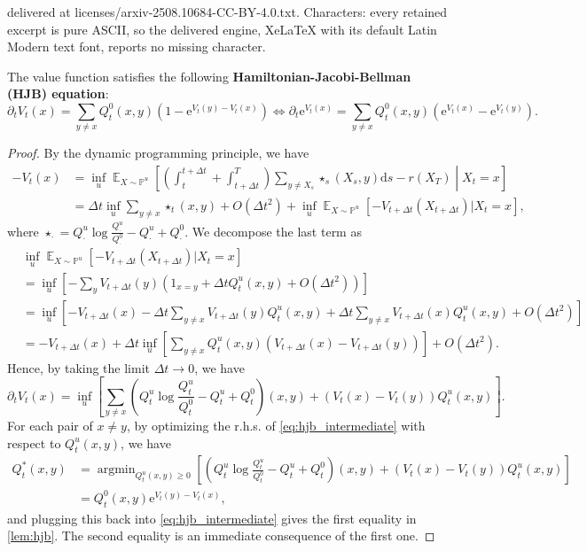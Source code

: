 \documentclass[10pt,a4paper]{amsart}
\newcommand{\E}{\operatorname{\mathbb{E}}}
\newcommand{\argmin}{\mathop\mathrm{argmin}}
\newcommand{\e}{\mathrm{e}}
\newcommand{\ro}[1]{\left(#1\right)} %
\newcommand{\sq}[1]{\left[#1\right]} %
\renewcommand{\P}{\mathbb{P}}
\renewcommand{\d}{\mathrm{d}}
\begin{document}
delivered at licenses/arxiv-2508.10684-CC-BY-4.0.txt. Characters: every retained excerpt is pure ASCII, so the delivered engine, XeLaTeX with its default Latin Modern text font, reports no missing character.
\begin{lemma}
    The value function satisfies the following \textbf{Hamiltonian-Jacobi-Bellman (HJB) equation}:
    \begin{equation}
        \partial_tV_t(x)=\sum_{y\ne x}Q^0_t(x,y)(1-\e^{V_t(y)-V_t(x)})\iff\partial_t\e^{V_t(x)}=\sum_{y\ne x}Q^0_t(x,y)(\e^{V_t(x)}-\e^{V_t(y)}).
        \label{eq:hjb}
    \end{equation}
    \label{lem:hjb}
\end{lemma}

\begin{proof}
By the dynamic programming principle, we have
\begin{align*}
    -V_t(x)&=\inf_u\E_{X\sim\P^u}\sq{\ro{\int_t^{t+\Delta t}+\int_{t+\Delta t}^T}\sum_{y\ne X_s}\star_s(X_s,y)\d s-r(X_T)\middle|X_t=x}\\
    &=\Delta t\inf_u\sum_{y\ne x}\star_t(x,y)+O(\Delta t^2)+\inf_u\E_{X\sim\P^u}[-V_{t+\Delta t}(X_{t+\Delta t})|X_t=x],
\end{align*}
where $\star_\cdot=Q^u_\cdot\log\frac{Q^u_\cdot}{Q^0_\cdot}-Q^u_\cdot+Q^0_\cdot$. We decompose the last term as
\begin{align*}
    &\inf_u\E_{X\sim\P^u}[-V_{t+\Delta t}(X_{t+\Delta t})|X_t=x]\\
    &=\inf_u\sq{-\sum_yV_{t+\Delta t}(y)\ro{1_{x=y}+\Delta tQ^u_t(x,y)+O(\Delta t^2)}}\\
    &=\inf_u\sq{-V_{t+\Delta t}(x)-\Delta t\sum_{y\ne x}V_{t+\Delta t}(y)Q^u_t(x,y)+\Delta t\sum_{y\ne x}V_{t+\Delta t}(x)Q^u_t(x,y)+O(\Delta t^2)}\\
    &=-V_{t+\Delta t}(x)+\Delta t\inf_u\sq{\sum_{y\ne x}Q^u_t(x,y)(V_{t+\Delta t}(x)-V_{t+\Delta t}(y))}+O(\Delta t^2).
\end{align*}
Hence, by taking the limit $\Delta t\to0$, we have
\begin{equation}
    \partial_tV_t(x)=\inf_u\sq{\sum_{y\ne x}\ro{Q^u_t\log\frac{Q^u_t}{Q^0_t}-Q^u_t+Q^0_t}(x,y)+(V_t(x)-V_t(y))Q^u_t(x,y)}.
    \label{eq:hjb_intermediate}
\end{equation}
For each pair of $x\ne y$, by optimizing the r.h.s. of \cref{eq:hjb_intermediate} with respect to $Q^u_t(x,y)$, we have
\begin{align*}
    Q^*_t(x,y)&=\argmin_{Q^u_t(x,y)\ge0}\sq{\ro{Q^u_t\log\frac{Q^u_t}{Q^0_t}-Q^u_t+Q^0_t}(x,y)+(V_t(x)-V_t(y))Q^u_t(x,y)}\\
    &=Q^0_t(x,y)\e^{V_t(y)-V_t(x)},
\end{align*}
and plugging this back into \cref{eq:hjb_intermediate} gives the first equality in \cref{lem:hjb}. The second equality is an immediate consequence of the first one.
\end{proof}
\end{document}
